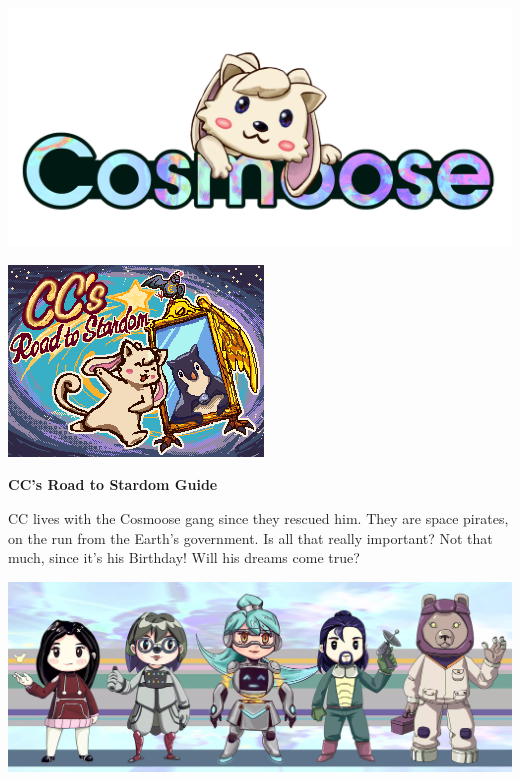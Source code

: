\documentclass{article}
\newcommand{\bo}[1] {\textbf{#1}}
\newcommand{\bckg}[1]{\AddToShipoutPictureBG*{\texttt{[image: \#1]}}}
\begin{document}
\bckg{img/bg}
\begin{center}
    \includegraphics[height=.2\paperheight]{img/cclogo}

    \includegraphics[height=.5\paperheight]{img/loading}

    \vspace{.5cm}
    {\Huge \bo{CC's Road to Stardom Guide}}
\end{center}

\clearpage

\bckg{img/bg}

CC lives with the Cosmoose gang since they rescued him.
They are space pirates, on the run from the Earth's government. Is all that really important?
Not that much, since it's his Birthday! Will his dreams come true?

\begin{center}
    \includegraphics[height=.2\paperheight]{img/crew}
\end{center}
\end{document}
